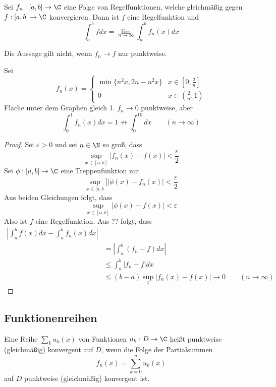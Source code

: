 \documentclass[a4paper,10pt]{scrartcl}
\begin{document}
\begin{thm}
Sei $f_n:[a,b]\to\C$ eine Folge von Regelfunktionen, welche gleichmäßig gegen $f:[a,b]\to\C$ konvergieren. Dann ist $f$ eine Regelfunktion und
\[
\int_a^bfdx=\lim_{n\to\infty}\int_a^bf_n(x)dx
\]
\begin{note}
Die Aussage gilt nicht, wenn $f_n\to f$ nur punktweise.
\end{note}
\begin{ex*}
Sei
\[
f_n(x)=\begin{cases}
\min\{n^2x,2n-n^2x\}&x\in[0,\frac 2n]\\
0&x\in (\frac 2n, 1)
\end{cases}
\]
Fläche unter dem Graphen gleich 1. $f_n\to 0$ punktweise, aber
\[
\int_0^1f_n(x)dx=1\not\to \int_0^10dx \qquad (n\to\infty)
\]
\end{ex*}
\begin{proof}
Sei $\varepsilon>0$ und sei $n\in\N$ so groß, dass
\[
\sup_{x\in[a,b]}|f_n(x)-f(x)|<\frac{\varepsilon}2
\]
Sei $\phi:[a,b]\to\C$ eine Treppenfunktion mit
\[
\sup_{x\in[a,b}]|\phi(x)-f_n(x)|<\frac{\varepsilon}2
\]
Aus beiden Gleichungen folgt, dass
\[
\sup_{x\in[a,b]}|\phi(x)-f(x)|<\varepsilon
\]
Also ist $f$ eine Regelfunktion.
Aus ?? folgt, dass
\begin{align*}
|\int_a^bf(x)dx-\int_a^bf_n(x)dx|\\
&=|\int_a^b(f_n-f)dx|\\
&\le\int_a^b|f_n-f|dx\\
&\le(b-a)\sup_x|f_n(x)-f(x)|\to 0\qquad (n\to\infty)
\end{align*}
\end{proof}
\end{thm}

\subsection{Funktionenreihen}

Eine Reihe $\sum_ku_k(x)$ von Funktionen $u_k:D\to\C$ heißt punktweise (gleichmäßig) konvergent auf $D$, wenn die Folge der Partialsummen
\[
f_n(x)=\sum_{k=0}^nu_k(x)
\]
auf $D$ punktweise (gleichmäßig) konvergent ist.
\end{document}
